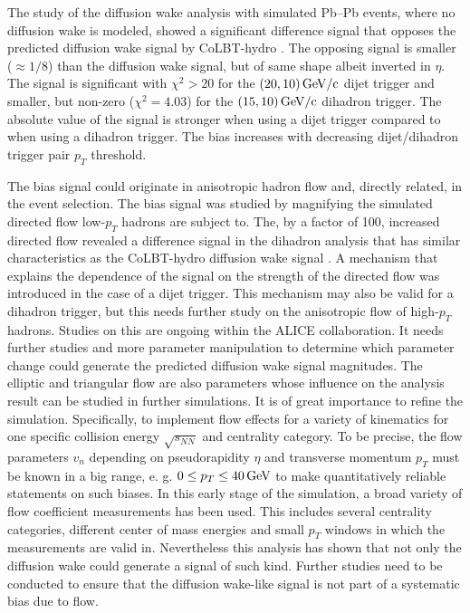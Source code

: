 \documentclass[
  a4paper,
  12pt,
  oneside,
  parskip=half,
  listof=totoc,
  bibliography=totoc,
  DIV=12,
  numbers=noenddot,
  BA.tex
  ]{subfiles}
\begin{document}
The study of the diffusion wake analysis with simulated Pb--Pb events, where no diffusion wake is modeled, showed a significant difference signal that opposes the predicted diffusion wake signal by CoLBT-hydro \cite{zhong_yang_colbt-hydro_2025}. The opposing signal is smaller ($\approx 1/8$) than the diffusion wake signal, but of same shape albeit inverted in $\eta$. The signal is significant with $\chi^2 > 20$ for the $(20,10)\bunit{GeV/c}$ dijet trigger and smaller, but non-zero ($\chi^2 = 4.03$) for the $(15,10)\bunit{GeV/c}$ dihadron trigger. The absolute value of the signal is stronger when using a dijet trigger compared to when using a dihadron trigger. The bias increases with decreasing dijet/dihadron trigger pair $p_T$ threshold. 

The bias signal could originate in anisotropic hadron flow and, directly related, in the event selection. The bias signal was studied by magnifying the simulated directed flow low-$p_T$ hadrons are subject to. The, by a factor of 100, increased directed flow revealed a difference signal in the dihadron analysis that has similar characteristics as the CoLBT-hydro diffusion wake signal \cite{zhong_yang_colbt-hydro_2025}. A mechanism that explains the dependence of the signal on the strength of the directed flow was introduced in the case of a dijet trigger. This mechanism may also be valid for a dihadron trigger, but this needs further study on the anisotropic flow of high-$p_T$ hadrons. Studies on this are ongoing within the ALICE collaboration. It needs further studies and more parameter manipulation to determine which parameter change could generate the predicted diffusion wake signal magnitudes. The elliptic and triangular flow are also parameters whose influence on the analysis result can be studied in further simulations. It is of great importance to refine the simulation. Specifically, to implement flow effects for a variety of kinematics for one specific collision energy $\sqrt{s_{NN}}$ and centrality category. To be precise, the flow parameters $v_n$ depending on pseudorapidity $\eta$ and transverse momentum $p_T$ must be known in a big range, e. g. $0 \leq p_T \leq 40 \bunit{GeV}$ to make quantitatively reliable statements on such biases. In this early stage of the simulation, a broad variety of flow coefficient measurements has been used. This includes several centrality categories, different center of mass energies and small $p_T$ windows in which the measurements are valid in. Nevertheless this analysis has shown that not only the diffusion wake could generate a signal of such kind. Further studies need to be conducted to ensure that the diffusion wake-like signal is not part of a systematic bias due to flow. 
\end{document}
